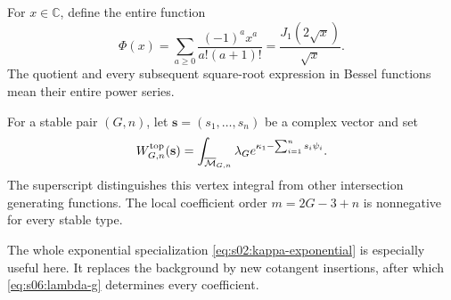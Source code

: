 For $x\in\mathbb C$, define the entire function
\begin{equation}\label{eq:s06:phi}
 \Phi(x)=\sum_{a\geq0}\frac{(-1)^a x^a}{a!(a+1)!}
        =\frac{J_1(2\sqrt x)}{\sqrt x}.
\end{equation}
The quotient and every subsequent square-root expression in Bessel
functions mean their entire power series.

For a stable pair $(G,n)$, let $\mathbf s=(s_1,\ldots,s_n)$
be a complex vector and set
\begin{equation}\label{eq:s06:vertex-definition}
 W^{\rm top}_{G,n}(\mathbf s)
  =\int_{\overline{\mathcal{M}}_{G,n}}\lambda_G
                   e^{\kappa_1-\sum_{i=1}^n s_i\psi_i}.
\end{equation}
The superscript distinguishes this vertex integral from other
intersection generating functions. The local coefficient order
$m=2G-3+n$ is nonnegative for every stable type.

The whole exponential specialization
\eqref{eq:s02:kappa-exponential} is especially useful here. It
replaces the background by new cotangent insertions, after which
\eqref{eq:s06:lambda-g} determines every coefficient.


